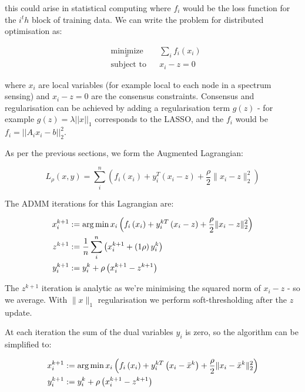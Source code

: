 \documentclass{article}
\begin{document}
this could arise in statistical computing where \(f_i\) would be the loss function for the \(i^th\) block of training data. We can write the problem for distributed optimisation as:

\begin{equation*}
\begin{aligned}
& \underset{x}{\text{minimize}}
& & \sum_i f_i\left( x_i \right) \\
& \text{subject to}
& & x_i - z = 0
\label{admm_consensus}
\end{aligned}
\end{equation*}

where \(x_i\) are local variables (for example local to each node in a spectrum sensing) and \(x_i - z = 0\) are the consensus constraints. Consensus and regularisation can be achieved by adding a regularisation term \(g\left(z\right)\) - for example \(g\left(z\right) = \lambda||x||_1\) corresponds to the LASSO, and the \(f_i\) would be \(f_i = ||A_ix_i - b||_2^2\). 

As per the previous sections, we form the Augmented Lagrangian:

\begin{equation}
L_\rho\left(x,y\right) = \sum_i^n \left(f_i\left( x_i \right) + y_i^T\left(x_i-z\right) + \frac{\rho}{2}\|x_i-z\|_2^2\right)
\end{equation}

The ADMM iterations for this Lagrangian are:

\begin{align}
x_i^{k+1} &:= \operatorname*{arg\,min}{x_i} \left(f_i\left( x_i \right) + y_i^{kT}\left(x_i-z\right) + \frac{\rho}{2}\|x_i-z\|_2^2\right)\\
z^{k+1} &:= \frac{1}{n}\sum_i^n \left(x_i^{k+1} + \left(1\rho\right)y_i^k\right)\\
y_i^{k+1} &:= y_i^{k} + \rho \left(x_i^{k+1} - z^{k+1} \right)
\label{consensus_iterations}
\end{align}

The \(z^{k+1}\) iteration is analytic as we're minimising the squared norm of \(x_i - z\) - so we average. With \(\|x\|_1\) regularisation we perform soft-thresholding after the \(z\) update.

At each iteration the sum of the dual variables \(y_i\) is zero, so the algorithm can be simplified to:

\begin{align}
x_i^{k+1} &:= \operatorname*{arg\,min}{x_i} \left(f_i\left( x_i \right) + y_i^{kT}\left(x_i-\bar{x}^k\right) + \frac{\rho}{2}\|x_i-\bar{x}^k\|_2^2\right)\\
y_i^{k+1} &:= y_i^{k} + \rho \left(x_i^{k+1} - z^{k+1} \right)
\label{simple_consensus_iterations}
\end{align}
 
\end{document}
